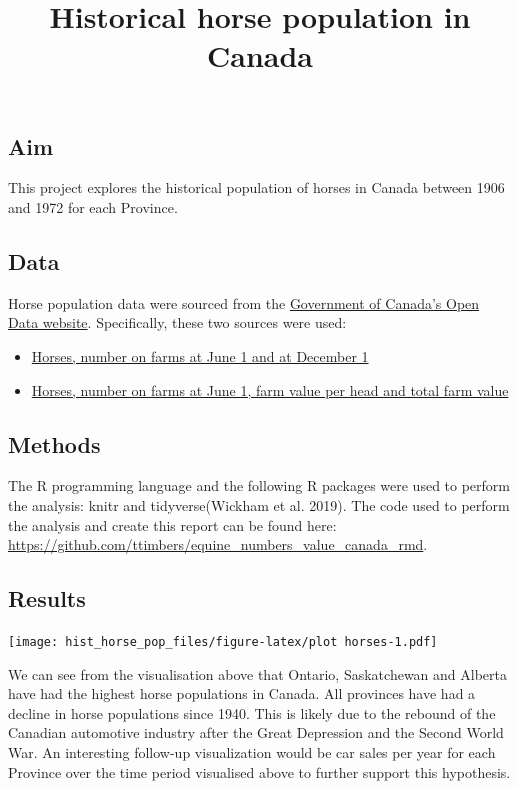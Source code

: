 \documentclass[
]{article}
\title{Historical horse population in Canada}
\author{}
\date{\vspace{-2.5em}}
\providecommand{\tightlist}{%
  \setlength{\itemsep}{0pt}\setlength{\parskip}{0pt}}
\begin{document}
\maketitle

\hypertarget{aim}{%
\subsection{Aim}\label{aim}}

This project explores the historical population of horses in Canada
between 1906 and 1972 for each Province.

\hypertarget{data}{%
\subsection{Data}\label{data}}

Horse population data were sourced from the
\href{http://open.canada.ca/en/open-data}{Government of Canada's Open
Data website}. Specifically, these two sources were used:

\begin{itemize}
\tightlist
\item
  \href{http://open.canada.ca/data/en/dataset/43b3a9b3-3842-45e7-8bc8-c4c27b9462ab}{Horses,
  number on farms at June 1 and at December 1}
\item
  \href{http://open.canada.ca/data/en/dataset/b374f60b-9580-44dc-83f6-c0a850c15f30}{Horses,
  number on farms at June 1, farm value per head and total farm value}
\end{itemize}

\hypertarget{methods}{%
\subsection{Methods}\label{methods}}

The R programming language and the following R packages were used to
perform the analysis: knitr and tidyverse(Wickham et al. 2019). The code
used to perform the analysis and create this report can be found here:
\url{https://github.com/ttimbers/equine_numbers_value_canada_rmd}.

\hypertarget{results}{%
\subsection{Results}\label{results}}

\texttt{[image: hist\_horse\_pop\_files/figure-latex/plot horses-1.pdf]}

We can see from the visualisation above that Ontario, Saskatchewan and
Alberta have had the highest horse populations in Canada. All provinces
have had a decline in horse populations since 1940. This is likely due
to the rebound of the Canadian automotive industry after the Great
Depression and the Second World War. An interesting follow-up
visualization would be car sales per year for each Province over the
time period visualised above to further support this hypothesis.
\end{document}
